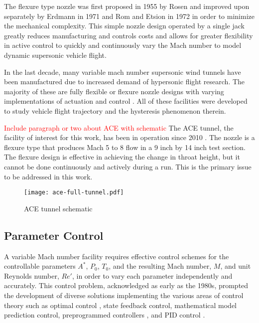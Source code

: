 The flexure type nozzle was first proposed in 1955 by Rosen \cite{rosen} and improved upon separately by Erdmann in 1971\cite{erdmann} and Rom and Etsion in 1972 \cite{erdmann,rom} in order to minimize the mechanical complexity. This simple nozzle design operated by a single jack greatly reduces manufacturing and controls costs and allows for greater flexibility in active control to quickly and continuously vary the Mach number to model dynamic supersonic vehicle flight.

In the last decade, many variable mach number supersonic wind tunnels have been manufactured due to increased demand of hypersonic flight research. The majority of these are fully flexible or flexure nozzle designs with varying implementations of actuation and control \cite{ilic-1,shahrbabaki-1,durand,laguarda,chen,guo,lv,qi,steeves}. All of these facilities were developed to study vehicle flight trajectory and the hysteresis phenomenon therein.

\textcolor{red}{Include paragraph or two about ACE with schematic} The ACE tunnel, the facility of interest for this work, has been in operation since 2010 \cite{ace09,ace10-calibrate,tichenor-dis}. The nozzle is a flexure type that produces Mach 5 to 8 flow in a 9 inch by 14 inch test section. The flexure design is effective in achieving the change in throat height, but it cannot be done continuously and actively during a run. This is the primary issue to be addressed in this work.

\begin{figure}[ht]
    \centering
    \texttt{[image: ace-full-tunnel.pdf]}
    \caption{ACE tunnel schematic}
    \label{fig:ace-full-tunnel}
\end{figure}

\subsection{Parameter Control}
A variable Mach number facility requires effective control schemes for the controllable parameters $A^*$, $P_0$, $T_0$, and the resulting Mach number, $M$, and unit Reynolds number, $Re'$, in order to vary each parameter independently and accurately. This control problem, acknowledged as early as the 1980s, prompted the development of diverse solutions implementing the various areas of control theory such as optimal control \cite{kraft,hwang}, state feedback control, mathematical model prediction control, preprogrammed controllers \cite{matsumoto}, and PID control \cite{fung,ilic-2,silva}.

